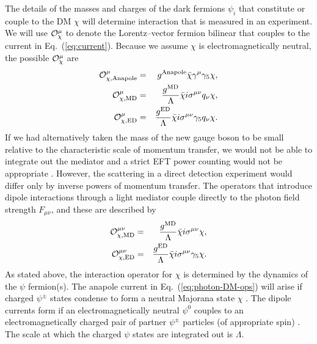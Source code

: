 \documentclass[11pt, a4paper]{article}
\newcommand{\Eq}[1]{Eq.~(\ref{#1})} \newcommand{\Eqs}[2]{Eqs.~(\ref{#1}) and (\ref{#2})} \newcommand{\Eqm}[2]{Eqs.~(\ref{#1}) through (\ref{#2})}
\begin{document}
The details of the masses and charges of the dark fermions $\psi_i$ that constitute or couple to the DM $\chi$ will determine interaction that is measured in an experiment. We will use ${\cal O}_\chi^\mu$ to denote the Lorentz--vector fermion bilinear that couples to the current in \Eq{eq:current}. Because we assume $\chi$ is electromagnetically neutral, the possible ${\cal O}_\chi^\mu$ are \cite{Gresham:2014vja, Gluscevic:2015sqa}
\begin{eqnarray} \label{eq:photon-DM-ops}
{\cal O}_{\rm \chi, Anapole}^\mu & = & g^{\rm Anapole}\bar \chi \gamma^\mu \gamma_5 \chi, \\
{\cal O}_{\rm \chi, MD}^\mu & = & \frac{g^{\rm MD}}{\Lambda}\bar \chi i \sigma^{\mu \nu} q_\nu \chi ,\\
{\cal O}_{\rm \chi, ED}^\mu & = & \frac{g^{\rm ED}}{\Lambda} \bar \chi i \sigma^{\mu \nu} \gamma_5 q_\nu \chi.
\end{eqnarray}
If we had alternatively taken the mass of the new gauge boson to be small relative to the characteristic scale of momentum transfer, we would not be able to integrate out the mediator and a strict EFT power counting would not be appropriate \cite{Fitzpatrick:2012ix}. However, the scattering in a direct detection experiment would differ only by inverse powers of momentum transfer. The operators that introduce dipole interactions through a light mediator couple directly to the photon field strength $F_{\mu \nu}$, and these are described by
\begin{eqnarray} \label{eq:photon-DM-ops2}
{\cal O}_{\rm \chi, MD}^{\mu \nu} & = & \frac{g^{\rm MD}}{\Lambda} \bar \chi i \sigma^{\mu \nu}  \chi ,\\
\label{eq:photon-DM-ops3}
{\cal O}_{\rm \chi, ED}^{\mu \nu} & = & \frac{g^{\rm ED}}{\Lambda} \bar \chi i \sigma^{\mu \nu} \gamma_5 \chi.
\end{eqnarray}
As stated above, the interaction operator for $\chi$ is determined by the dynamics of the $\psi$ fermion(s). The anapole current in \Eq{eq:photon-DM-ops} will arise if charged $\psi^\pm$ states condense to form a neutral Majorana state $\chi$ \cite{Bagnasco:1993st}. The dipole currents form if an electromagnetically neutral $\psi^0$ couples to an electromagnetically charged pair of partner $\psi^\pm$ particles (of appropriate spin) \cite{Weiner:2012gm}. The scale at which the charged $\psi$ states are integrated out is $\Lambda$.
\end{document}
